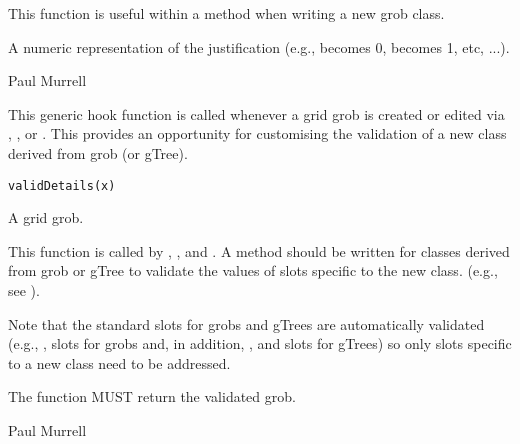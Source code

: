 %
\begin{Details}\relax
This function is useful within a  method
when writing a new grob class.
\end{Details}
%
\begin{Value}
A numeric representation of the justification (e.g.,
 becomes 0,  becomes 1, etc, ...).
\end{Value}
%
\begin{Author}\relax
Paul Murrell
\end{Author}
%
\begin{Description}\relax
This generic hook function is called whenever a grid grob is created
or
edited
via , ,  or .
This provides an opportunity for customising the validation of a
new class derived from grob (or gTree).
\end{Description}
%
\begin{Usage}
\begin{verbatim}
validDetails(x)
\end{verbatim}
\end{Usage}
%
\begin{Arguments}
\begin{ldescription}
\item[\code{x}]  A grid grob. 
\end{ldescription}
\end{Arguments}
%
\begin{Details}\relax
This function is called by , ,
 and .
A method should be written for classes derived from grob or gTree
to validate the values of slots specific to the new class.
(e.g., see ).

Note that the standard slots for grobs and gTrees are automatically
validated (e.g., ,  slots for grobs and,
in addition, , and  slots for
gTrees) so only slots specific to a new class need to be addressed.
\end{Details}
%
\begin{Value}
The function MUST return the validated grob.
\end{Value}
%
\begin{Author}\relax
 Paul Murrell 
\end{Author}
%
\begin{SeeAlso}\relax
\end{SeeAlso}
